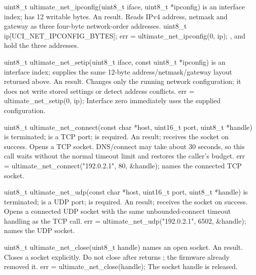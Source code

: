 \begin{referencechapter}
{uint8\_t ultimate\_net\_ipconfig(uint8\_t iface, uint8\_t *ipconfig)}
{ is an interface index;  has 12 writable bytes.}
{An  result.}
{Reads IPv4 address, netmask and gateway as three four-byte network-order
addresses.}
{uint8\_t ip[UCI\_NET\_IPCONFIG\_BYTES]; err = ultimate\_net\_ipconfig(0, ip);}
{,  and  hold the three addresses.}

{uint8\_t ultimate\_net\_setip(uint8\_t iface, const uint8\_t *ipconfig)}
{ is an interface index;  supplies the same 12-byte
address/netmask/gateway layout returned above.}
{An  result.}
{Changes only the running network configuration; it does not write stored
settings or detect address conflicts.}
{err = ultimate\_net\_setip(0, ip);}
{Interface zero immediately uses the supplied configuration.}

{uint8\_t ultimate\_net\_connect(const char *host, uint16\_t port, uint8\_t *handle)}
{ is terminated;  is a TCP port;  is required.}
{An  result;  receives the socket on success.}
{Opens a TCP socket. DNS/connect may take about 30 seconds, so this call waits
without the normal timeout limit and restores the caller's budget.}
{err = ultimate\_net\_connect("192.0.2.1", 80, \&handle);}
{ names the connected TCP socket.}

{uint8\_t ultimate\_net\_udp(const char *host, uint16\_t port, uint8\_t *handle)}
{ is terminated;  is a UDP port;  is required.}
{An  result;  receives the socket on success.}
{Opens a connected UDP socket with the same unbounded-connect timeout handling
as the TCP call.}
{err = ultimate\_net\_udp("192.0.2.1", 6502, \&handle);}
{ names the UDP socket.}

{uint8\_t ultimate\_net\_close(uint8\_t handle)}
{ names an open socket.}
{An  result.}
{Closes a socket explicitly. Do not close after 
returns ; the firmware already removed it.}
{err = ultimate\_net\_close(handle);}
{The socket handle is released.}


\end{referencechapter}
